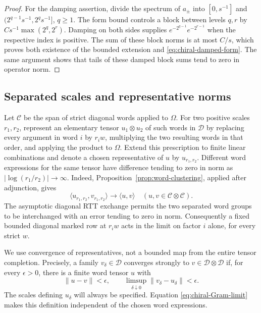 \begin{proof}
For the damping assertion, divide the spectrum of $a_\pm$ into
$[0,s^{-1}]$ and $(2^{q-1}s^{-1},2^qs^{-1}]$, $q\ge1$.
The form bound controls a block between levels $q,r$ by
$Cs^{-1}\max(2^q,2^r)$. Damping on both sides supplies
$e^{-2^{q-1}}e^{-2^{r-1}}$ when the respective index is positive.
The sum of these block norms is at most $C/s$, which proves both
existence of the bounded extension and \eqref{eq:chiral-damped-form}.
The same argument shows that tails of these damped block sums tend to
zero in operator norm.
\end{proof}

\subsection{Separated scales and representative norms}

Let $\mathcal C$ be the span of strict diagonal words applied to $\Omega$.
For two positive scales $r_1,r_2$, represent an elementary tensor
$u_1\otimes u_2$ of such words in $\mathcal D$ by replacing every argument
in word $i$ by $r_iw$, multiplying the two resulting words in that order,
and applying the product to $\Omega$. Extend this prescription to finite
linear combinations and denote a chosen representative of $u$ by
$u_{r_1,r_2}$. Different word expressions for the same tensor have
difference tending to zero in norm as $|\log(r_1/r_2)|\to\infty$.
Indeed, Proposition~\ref{prop:word-clustering}, applied after adjunction,
gives
\begin{equation}\label{eq:chiral-Gram-limit}
       \langle u_{r_1,r_2},v_{r_1,r_2}\rangle
                          \longrightarrow\langle u,v\rangle
                  \quad(u,v\in\mathcal C\otimes\mathcal C).
\end{equation}
The asymptotic diagonal RTT exchange permits the two separated word
groups to be interchanged with an error tending to zero in norm.
Consequently a fixed bounded diagonal marked row at $r_iw$ acts in the
limit on factor $i$ alone, for every strict $w$.

We use convergence of representatives, not a bounded map from the entire
tensor completion. Precisely, a family $v_\delta\in\mathcal D$ converges
strongly to $v\in\mathcal D\otimes\mathcal D$ if, for every $\epsilon>0$,
there is a finite word tensor $u$ with
\[
 \|u-v\|<\epsilon,\qquad
 \limsup_{\delta\downarrow0}\|v_\delta-u_\delta\|<\epsilon.
\]
The scales defining $u_\delta$ will always be specified. Equation
\eqref{eq:chiral-Gram-limit} makes this definition independent of the
chosen word expressions.

